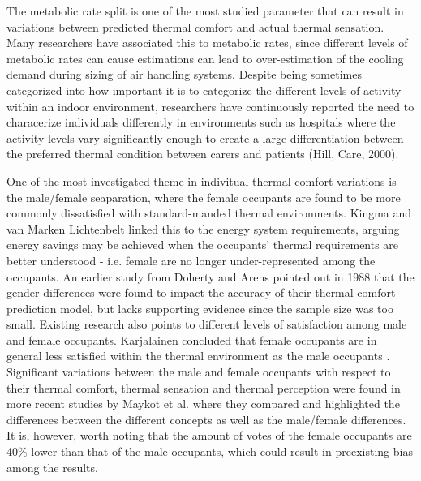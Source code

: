     The metabolic rate split is one of the most studied parameter that can result in variations between predicted thermal comfort and actual thermal sensation. Many researchers have associated this to metabolic rates, since different levels of metabolic rates can cause estimations can lead to over-estimation of the cooling demand during sizing of air handling systems. Despite being sometimes categorized into how important it is to categorize the different levels of activity within an indoor environment\cite{rupp_associations_2018}, researchers have continuously reported the need to characerize individuals differently in environments such as hospitals where the activity levels vary significantly enough to create a large differentiation between the preferred thermal condition between carers and patients (Hill, Care, 2000). 

    One of the most investigated theme in indivitual thermal comfort variations is the male/female seaparation, where the female occupants are found to be more commonly dissatisfied with standard-manded thermal environments\cite{kingma_energy_2015}. Kingma and van Marken Lichtenbelt linked this to the energy system requirements, arguing energy savings may be achieved when the occupants' thermal requirements are better understood - i.e. female are no longer under-represented among the occupants\cite{kingma_energy_2015}. An earlier study from Doherty and Arens pointed out in 1988 that the gender differences were found to impact the accuracy of their thermal comfort prediction model, but lacks supporting evidence since the sample size was too small\cite{doherty_evaluation_1988}. Existing research also points to different levels of satisfaction among male and female occupants. Karjalainen concluded that female occupants are in general less satisfied within the thermal environment as the male occupants \cite{karjalainen_thermal_2012}. Significant variations between the male and female occupants with respect to their thermal comfort, thermal sensation and thermal perception were found in more recent studies by Maykot et al. where they compared and highlighted the differences between the different concepts as well as the male/female differences. It is, however, worth noting that the amount of votes of the female occupants are 40\% lower than that of the male occupants, which could result in preexisting bias among the results. 

    \cite{kingma_energy_2015}
    \cite{rupp_associations_2018}
    \cite{maykot_assessment_2018}




